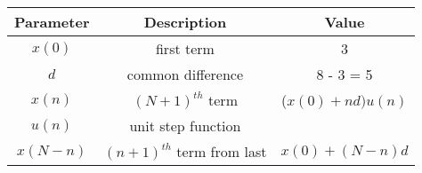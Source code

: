 \begin{tabular}{|c|c|c|}
        \hline
        \textbf{Parameter} & \textbf{Description}&\textbf{Value}\\
        \hline
        $x(0)$ & first term  & 3 \\
         \hline
        $d$ & common difference & 8 - 3 = 5 \\
        \hline
        $x(n)$ & $(N+1)^{th}$ term &($x(0) + nd)u(n)$ \\
        \hline
        $u(n)$  & unit step function  &\\
        \hline
        $x(N-n)$&$(n+1)^{th}$ term from last &$x(0) + (N - n)d$\\
        \hline
    \end{tabular}
